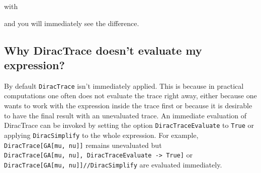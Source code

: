 \documentclass[../FeynCalcManual.tex]{subfiles}
\begin{document}
with

\begin{Shaded}
\begin{Highlighting}[]
\ExtensionTok{=}\NormalTok{;}
\ExtensionTok{=}\OperatorTok{[}\OperatorTok{,}  \OtherTok{{-}\textgreater{}} \OperatorTok{]}\NormalTok{;}
\ExtensionTok{=}\OperatorTok{[}\OperatorTok{,} \OperatorTok{\{}\OperatorTok{[}\OperatorTok{,} \OperatorTok{\{}\OperatorTok{\}],} \SpecialCharTok{{-}}\OperatorTok{[}\OperatorTok{,} \OperatorTok{\{}\OperatorTok{\}]\}} \OtherTok{{-}\textgreater{}} \OperatorTok{\{}\OperatorTok{[}\OperatorTok{,} \OperatorTok{\{}\OperatorTok{\}],} \SpecialCharTok{{-}}\OperatorTok{[}\OperatorTok{,} \OperatorTok{\{}\OperatorTok{\}]\},} 
\OtherTok{{-}\textgreater{}} \OperatorTok{\{}\OperatorTok{\},}\OtherTok{{-}\textgreater{}} \OperatorTok{,}\OtherTok{{-}\textgreater{}} \OperatorTok{\{}\OperatorTok{[}\OperatorTok{],} \OperatorTok{[}\OperatorTok{],} \OperatorTok{[}\OperatorTok{]\}]}\NormalTok{;}
\OperatorTok{[}\OperatorTok{,}\OtherTok{{-}\textgreater{}} \OperatorTok{\{}\OperatorTok{,} \OperatorTok{\},}\OtherTok{{-}\textgreater{}} \OperatorTok{,}\OtherTok{{-}\textgreater{}} \OperatorTok{]}\NormalTok{;}
\end{Highlighting}
\end{Shaded}

and you will immediately see the difference.

\subsection{Why DiracTrace doesn't evaluate my
expression?}\label{why-diractrace-doesnt-evaluate-my-expression}

By default \texttt{DiracTrace} isn't immediately applied. This is
because in practical computations one often does not evaluate the trace
right away, either because one wants to work with the expression inside
the trace first or because it is desirable to have the final result with
an unevaluated trace. An immediate evaluation of DiracTrace can be
invoked by setting the option \texttt{DiracTraceEvaluate} to
\texttt{True} or applying \texttt{DiracSimplify} to the whole
expression. For example,
\texttt{DiracTrace[\allowbreak{}GA[\allowbreak{}mu,\ \allowbreak{}nu]]}
remains unevaluated but
\texttt{DiracTrace[\allowbreak{}GA[\allowbreak{}mu,\ \allowbreak{}nu],\ \allowbreak{}DiracTraceEvaluate -> True]}
or
\texttt{DiracTrace[\allowbreak{}GA[\allowbreak{}mu,\ \allowbreak{}nu]]//DiracSimplify}
are evaluated immediately.
\end{document}
